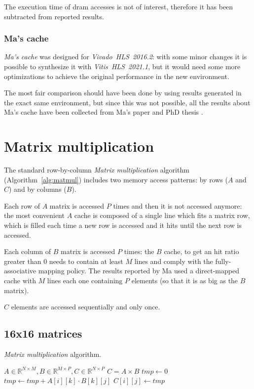 \documentclass[11pt,a4paper,oneside]{memoir}
\begin{document}
The execution time of \ac{dram} accesses is not of interest, therefore it has
been subtracted from reported results.

\subsubsection{Ma's cache}
\emph{Ma's cache} was designed for \emph{Vivado\texttrademark~HLS~2016.2}:
with some minor changes it is possible to synthesize it with
\emph{Vitis~HLS~2021.1}, but it would need some more optimizations to achieve
the original performance in the new environment.

The most fair comparison should have been done by using results generated in
the exact same environment, but since this was not possible, all the results
about Ma's cache have been collected from Ma's paper  and PhD
thesis .

\section{Matrix multiplication}
The standard row-by-column \emph{Matrix multiplication} algorithm
(Algorithm~\ref{alg:matmul}) includes two memory access patterns: by rows ($A$
and $C$) and by columns ($B$).

Each row of $A$ matrix is accessed $P$ times and then it is not accessed
anymore: the most convenient $A$ cache is composed of a single line which fits a
matrix row, which is filled each time a new row is accessed and it hits until
the next row is accessed.

Each column of $B$ matrix is accessed $P$ times: the $B$ cache, to get an hit
ratio greater than 0 needs to contain at least $M$ lines and comply with the
fully-associative mapping policy.
The results reported by Ma used a direct-mapped cache with $M$ lines each one
containing $P$ elements (so that it is as big as the $B$ matrix).

$C$ elements are accessed sequentially and only once.

\subsection{16x16 matrices}
\begin{algorithm}
	\caption{\emph{Matrix multiplication} algorithm.}\label{alg:matmul}
	\begin{algorithmic}
		\Require $A \in \mathbb{R}^{N \times M},
		B \in \mathbb{R}^{M \times P}, C \in \mathbb{R}^{N \times P}$
		\Ensure $C = A \times B$
					\State $tmp \gets 0$
						\State $tmp \gets tmp +
							A[i][k] \cdot B[k][j]$
					\EndFor
					\State $C[i][j] \gets tmp$
				\EndFor
			\EndFor
		\EndProcedure
	\end{algorithmic}
\end{algorithm}
\end{document}
